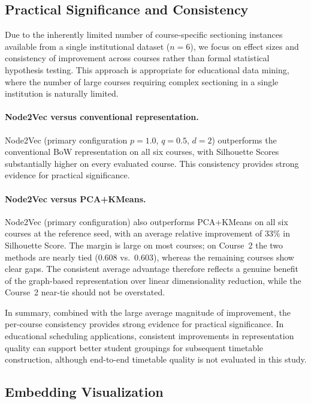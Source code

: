 \documentclass[pdflatex,sn-mathphys-num,iicol]{sn-jnl}%
\theoremstyle{thmstyleone}%
\theoremstyle{thmstyletwo}%
\theoremstyle{thmstylethree}%
\begin{document}
\subsection{Practical Significance and Consistency}
\label{sec:statistical}

Due to the inherently limited number of course-specific sectioning instances available from a single institutional dataset ($n=6$), we focus on effect sizes and consistency of improvement across courses rather than formal statistical hypothesis testing. This approach is appropriate for educational data mining, where the number of large courses requiring complex sectioning in a single institution is naturally limited.

\paragraph{Node2Vec versus conventional representation.}
Node2Vec (primary configuration $p{=}1.0$, $q{=}0.5$, $d{=}2$) outperforms the conventional BoW representation on all six courses, with Silhouette Scores substantially higher on every evaluated course. This consistency provides strong evidence for practical significance.

\paragraph{Node2Vec versus PCA+KMeans.}
Node2Vec (primary configuration) also outperforms PCA+KMeans on all six courses at the reference seed, with an average relative improvement of $33\%$ in Silhouette Score. The margin is large on most courses; on Course~2 the two methods are nearly tied ($0.608$ vs.\ $0.603$), whereas the remaining courses show clear gaps. The consistent average advantage therefore reflects a genuine benefit of the graph-based representation over linear dimensionality reduction, while the Course~2 near-tie should not be overstated.

In summary, combined with the large average magnitude of improvement, the per-course consistency provides strong evidence for practical significance. In educational scheduling applications, consistent improvements in representation quality can support better student groupings for subsequent timetable construction, although end-to-end timetable quality is not evaluated in this study.

\subsection{Embedding Visualization}
\end{document}
